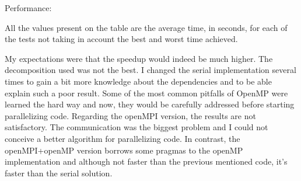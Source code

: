 \documentclass[times, 10pt,twocolumn]{article}
\begin{document}
Performance:

	All the values present on the table are the average time, in seconds, for each of the tests not taking in account the best and worst time achieved.

	My expectations were that the speedup would indeed be much higher. The decomposition used was not the best. I changed the serial implementation several times to gain a bit more knowledge about the dependencies and to be able explain such a poor result. Some of the most common pitfalls of OpenMP were learned the hard way and now, they would be carefully addressed before starting parallelizing code. Regarding the openMPI version, the results are not satisfactory. The communication was the biggest problem and I could not conceive a better algorithm for parallelizing code. In contrast, the openMPI+openMP version borrows some pragmas to the openMP implementation and although not faster than the previous mentioned code, it's faster than the serial solution.
\end{document}
